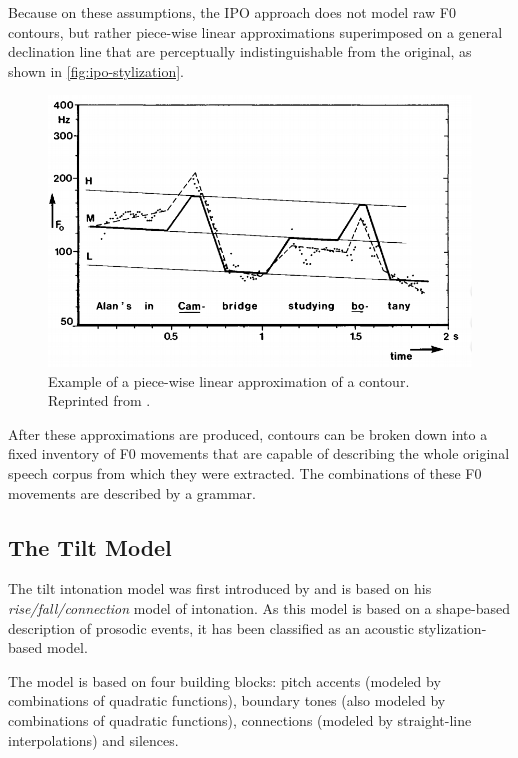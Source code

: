 Because on these assumptions, the IPO approach does not model raw \ac{F0} contours, but rather piece-wise linear approximations superimposed on a general declination line that are perceptually indistinguishable from the original, as shown in \autoref{fig:ipo-stylization}.


\begin{figure}[H]
\centering
\includegraphics[scale=0.5]{figures/ipo-contour-stylization.png}
\caption[IPO model contour approximation]{Example of a piece-wise linear approximation of a contour. Reprinted from \citet[p.\ 49]{Gussenhoven1992Perceptual}.}
\label{fig:ipo-stylization}
\end{figure}

After these approximations are produced, contours can be broken down into a fixed inventory of \ac{F0} movements that are capable of describing the whole original speech corpus from which they were extracted.
The combinations of these \ac{F0} movements are described by a grammar.


\subsection{The Tilt Model}

The tilt intonation model was first introduced by \citet{Taylor1994Rise} and is based on his \emph{rise/fall/connection} model of intonation.
As this model is based on a shape-based description of prosodic events, it has been classified as an acoustic stylization-based model.

The model is based on four building blocks: pitch accents (modeled by combinations of quadratic functions), boundary tones (also modeled by combinations of quadratic functions), connections (modeled by straight-line interpolations) and silences.

